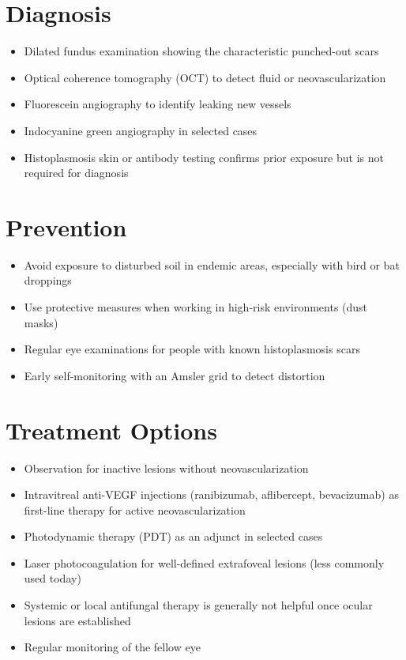 \section{Diagnosis}
\begin{itemize}[noitemsep]
  \item Dilated fundus examination showing the characteristic punched-out scars
  \item Optical coherence tomography (OCT) to detect fluid or neovascularization
  \item Fluorescein angiography to identify leaking new vessels
  \item Indocyanine green angiography in selected cases
  \item Histoplasmosis skin or antibody testing confirms prior exposure but is not required for diagnosis
\end{itemize}
\section{Prevention}
\begin{itemize}[noitemsep]
  \item Avoid exposure to disturbed soil in endemic areas, especially with bird or bat droppings
  \item Use protective measures when working in high-risk environments (dust masks)
  \item Regular eye examinations for people with known histoplasmosis scars
  \item Early self-monitoring with an Amsler grid to detect distortion
\end{itemize}
\section{Treatment Options}
\begin{itemize}[noitemsep]
  \item Observation for inactive lesions without neovascularization
  \item Intravitreal anti-VEGF injections (ranibizumab, aflibercept, bevacizumab) as first-line therapy for active neovascularization
  \item Photodynamic therapy (PDT) as an adjunct in selected cases
  \item Laser photocoagulation for well-defined extrafoveal lesions (less commonly used today)
  \item Systemic or local antifungal therapy is generally not helpful once ocular lesions are established
  \item Regular monitoring of the fellow eye
\end{itemize}
